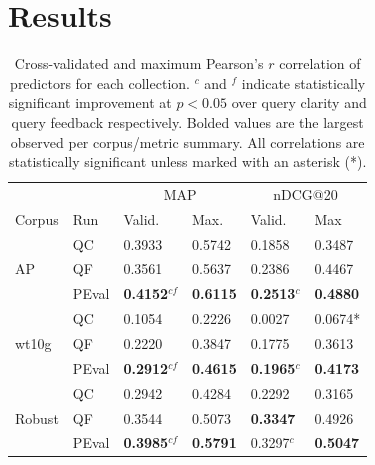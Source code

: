 \documentclass{sig-alternate}
\begin{document}
\section{Results}\label{section.results}

\begin{table}[t]
\centering
\begin{tabular}{|l|l|l|l|l|l|} \hline
& & \multicolumn{2}{c|}{MAP} & \multicolumn{2}{c|}{nDCG@20} \\ \cline{3-6}
Corpus & Run & Valid. & Max. & Valid. & Max \\ \hline\hline
\multirow{3}{*}{AP} & QC & 0.3933 & 0.5742 & 0.1858 & 0.3487 \\ \cline{2-6}
& QF & 0.3561 & 0.5637 & 0.2386 & 0.4467 \\ \cline{2-6}
& PEval & \textbf{0.4152}$^{cf}$ & \textbf{0.6115} & \textbf{0.2513}$^{c}$ & \textbf{0.4880} \\ \hline\hline
\multirow{3}{*}{wt10g} & QC & 0.1054 & 0.2226 & 0.0027 & 0.0674* \\ \cline{2-6}
& QF & 0.2220 & 0.3847 & 0.1775 & 0.3613 \\ \cline{2-6}
& PEval & \textbf{0.2912}$^{cf}$ & \textbf{0.4615} & \textbf{0.1965}$^{c}$ & \textbf{0.4173} \\ \hline\hline
\multirow{3}{*}{Robust} & QC & 0.2942 & 0.4284 & 0.2292 & 0.3165 \\ \cline{2-6}
& QF & 0.3544 & 0.5073 & \textbf{0.3347} & 0.4926 \\ \cline{2-6}
& PEval & \textbf{0.3985}$^{cf}$ & \textbf{0.5791} & 0.3297$^{c}$ & \textbf{0.5047} \\ \hline
\end{tabular}
\caption{Cross-validated and maximum Pearson's $r$ correlation of predictors for each collection. $^c$ and $^f$ indicate statistically significant improvement at $p < 0.05$ over query clarity and query feedback respectively. Bolded values are the largest observed per corpus/metric summary. All correlations are statistically significant unless marked with an asterisk (*).}
\label{table.results.self.pearson}
\end{table}
\end{document}
